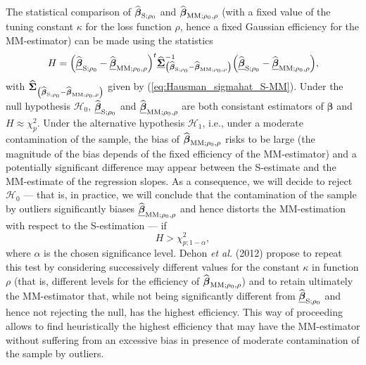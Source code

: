 The statistical comparison of $\sthat{\boldsymbol\beta}_{\mathrm{S}%
;\rho_{0}}$ and $\widehat{\boldsymbol\beta}_{\mathrm{MM};\rho_{0},\rho}$
(with a fixed value of the tuning constant $\kappa$ for the loss function
$\rho$, hence a fixed Gaussian efficiency for the MM-estimator) can be made
using the statistics
\begin{equation}
H=\left(  \sthat{\underline{\boldsymbol\beta}}_{\mathrm{S};\rho_{0}%
}-\sthat{\underline{\boldsymbol\beta}}_{\mathrm{MM};\rho_{0},\rho}\right)
^{t}\sthat{\underline{\boldsymbol{\Sigma}}}_{\left(  \widehat
{\boldsymbol\beta}_{\mathrm{S};\rho_{0}}-\sthat{\boldsymbol\beta%
}_{\mathrm{MM};\rho_{0},\rho}\right)  }^{-1}\left(  \sthat{\underline
{\boldsymbol\beta}}_{\mathrm{S};\rho_{0}}-\sthat{\underline
{\boldsymbol\beta}}_{\mathrm{MM};\rho_{0},\rho}\right)  ,
\label{Hausman_MMvsS}%
\end{equation}
with $\sthat{\boldsymbol{\Sigma}}_{\left(  \sthat{\boldsymbol\beta%
}_{\mathrm{S};\rho_{0}}-\sthat{\boldsymbol\beta}_{\mathrm{MM};\rho
_{0},\rho}\right)  }$ given by (\ref{eq:Hausman_sigmahat_S-MM}). Under the
null hypothesis $\mathcal{H}_{0}$, $\sthat{\underline{\boldsymbol\beta}%
}_{\mathrm{S};\rho_{0}}$ and $\sthat{\underline{\boldsymbol\beta}%
}_{\mathrm{MM};\rho_{0},\rho}$ are both consistant estimators of
\underline{$\boldsymbol\beta$} and $H\approx\chi_{p}^{2}$. Under the
alternative hypothesis $\mathcal{H}_{1}$, i.e., under a moderate contamination
of the sample, the bias of $\widehat{\boldsymbol\beta}_{\mathrm{MM};\rho
_{0},\rho}$ risks to be large (the magnitude of the bias depends of the fixed
efficiency of the MM-estimator) and a potentially significant difference may
appear between the S-estimate and the MM-estimate of the regression slopes. As
a consequence, we will decide to reject $\mathcal{H}_{0}$ --- that is, in
practice, we will conclude that the contamination of the sample by outliers
significantly biases $\sthat{\underline{\boldsymbol\beta}}_{\mathrm{MM}%
;\rho_{0},\rho}$ and hence distorts the MM-estimation with respect to the
S-estimation --- if
\[
H>\chi_{p;1-\alpha}^{2},
\]
where $\alpha$ is the chosen significance level. Dehon \textit{et al.} (2012)
propose to repeat this test by considering successively different values for
the constant $\kappa$ in function $\rho$ (that is, different levels for the
efficiency of $\widehat{\boldsymbol\beta}_{\mathrm{MM};\rho_{0},\rho}$) and
to retain ultimately the MM-estimator that, while not being significantly
different from $\sthat{\underline{\boldsymbol\beta}}_{\mathrm{S};\rho_{0}%
}$ and hence not rejecting the null, has the highest efficiency. This way of
proceeding allows to find heuristically the highest efficiency that may have
the MM-estimator without suffering from an excessive bias in presence of
moderate contamination of the sample by outliers.



